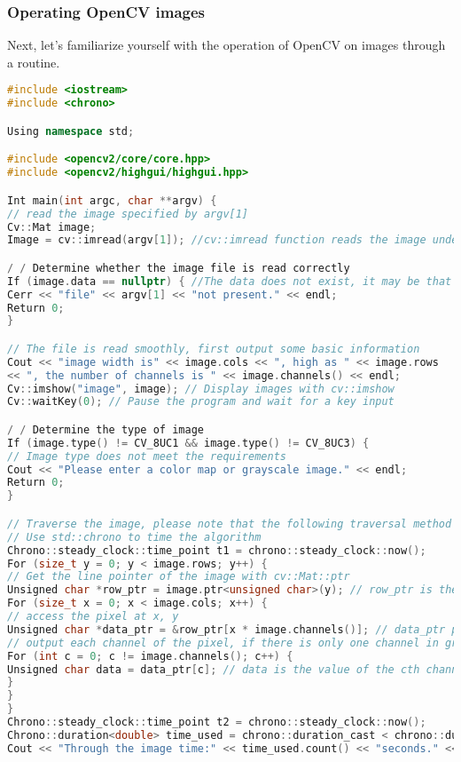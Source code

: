 \subsubsection{Operating OpenCV images}
Next, let's familiarize yourself with the operation of OpenCV on images through a routine.
\begin{lstlisting}[language=C++,caption=slambook/ch5/imageBasics/imageBasics.cpp]
#include <iostream>
#include <chrono>

Using namespace std;

#include <opencv2/core/core.hpp>
#include <opencv2/highgui/highgui.hpp>

Int main(int argc, char **argv) {
// read the image specified by argv[1]
Cv::Mat image;
Image = cv::imread(argv[1]); //cv::imread function reads the image under the specified path

/ / Determine whether the image file is read correctly
If (image.data == nullptr) { //The data does not exist, it may be that the file does not exist
Cerr << "file" << argv[1] << "not present." << endl;
Return 0;
}

// The file is read smoothly, first output some basic information
Cout << "image width is" << image.cols << ", high as " << image.rows 
<< ", the number of channels is " << image.channels() << endl;
Cv::imshow("image", image); // Display images with cv::imshow
Cv::waitKey(0); // Pause the program and wait for a key input

/ / Determine the type of image
If (image.type() != CV_8UC1 && image.type() != CV_8UC3) {
// Image type does not meet the requirements
Cout << "Please enter a color map or grayscale image." << endl;
Return 0;
}

// Traverse the image, please note that the following traversal method can also be used for random pixel access
// Use std::chrono to time the algorithm
Chrono::steady_clock::time_point t1 = chrono::steady_clock::now();
For (size_t y = 0; y < image.rows; y++) {
// Get the line pointer of the image with cv::Mat::ptr
Unsigned char *row_ptr = image.ptr<unsigned char>(y); // row_ptr is the head pointer of the yth line
For (size_t x = 0; x < image.cols; x++) {
// access the pixel at x, y
Unsigned char *data_ptr = &row_ptr[x * image.channels()]; // data_ptr points to the pixel data to be accessed
// output each channel of the pixel, if there is only one channel in grayscale
For (int c = 0; c != image.channels(); c++) {
Unsigned char data = data_ptr[c]; // data is the value of the cth channel of I(x,y)
}
}
}
Chrono::steady_clock::time_point t2 = chrono::steady_clock::now();
Chrono::duration<double> time_used = chrono::duration_cast < chrono::duration < double >> (t2 - t1);
Cout << "Through the image time:" << time_used.count() << "seconds." << endl;


\end{lstlisting}
